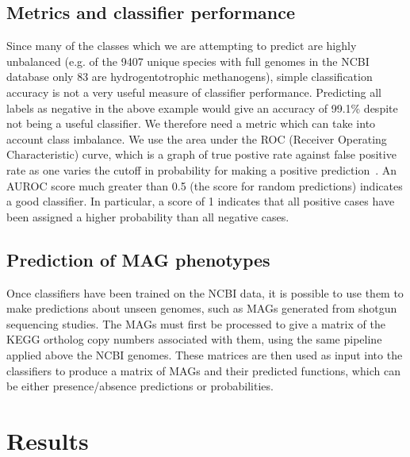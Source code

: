 \documentclass[10pt,letterpaper]{article}
\begin{document}
\subsection*{Metrics and classifier performance}
Since many of the classes which we are attempting to predict are highly unbalanced (e.g. of the 9407 unique species with full genomes in the NCBI database only 83 are hydrogentotrophic methanogens), simple classification accuracy is not a very useful measure of classifier performance. Predicting all labels as negative in the above example would give an accuracy of 99.1\% despite not being a useful classifier. We therefore need a metric which can take into account class imbalance. We use the area under the ROC (Receiver Operating Characteristic) curve, which is a graph of true postive rate against false positive rate as one varies the cutoff in probability for making a positive prediction~\cite{Fawcett2006,Flach2011}. An AUROC score much greater than 0.5 (the score for random predictions) indicates a good classifier. In particular, a score of 1 indicates that all positive cases have been assigned a higher probability than all negative cases.

\subsection*{Prediction of MAG phenotypes}
Once classifiers have been trained on the NCBI data, it is possible to use them to make predictions about unseen genomes, such as MAGs generated from shotgun sequencing studies. The MAGs must first be processed to give a matrix of the KEGG ortholog copy numbers associated with them, using the same pipeline applied above the NCBI genomes. These matrices are then used as input into the classifiers to produce a matrix of MAGs and their predicted functions, which can be either presence/absence predictions or probabilities. 


\section*{Results}
\end{document}
